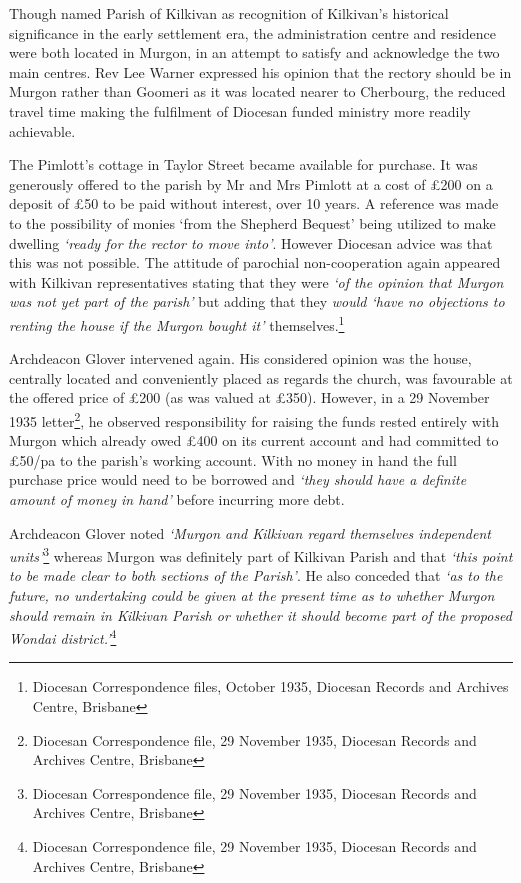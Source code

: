 Though named Parish of Kilkivan as recognition of Kilkivan's historical significance in the early settlement era, the administration centre and residence were both located in Murgon, in an attempt to satisfy and acknowledge the two main centres. Rev Lee Warner expressed his opinion that the rectory should be in Murgon rather than Goomeri as it was located nearer to Cherbourg, the reduced travel time making the fulfilment of Diocesan funded ministry more readily achievable.



The Pimlott's cottage in Taylor Street became available for purchase. It was generously offered to the parish by Mr and Mrs Pimlott at a cost of \pounds200 on a deposit of \pounds50 to be paid without interest, over 10 years. A reference was made to the possibility of monies `from the Shepherd Bequest' being utilized to make dwelling \emph{`ready for the rector to move into'}. However Diocesan advice was that this was not possible. The attitude of parochial non-cooperation again appeared with Kilkivan representatives stating that they were \emph{`of the opinion that Murgon was not yet part of the parish'} but adding that they \emph{would `have no objections to renting the house if the Murgon bought it'} themselves.\footnote{Diocesan Correspondence files, October 1935, Diocesan Records and Archives Centre, Brisbane}


Archdeacon Glover intervened again. His considered opinion was the house, centrally located and conveniently placed as regards the church, was favourable at the offered price of \pounds200 (as was valued at \pounds350). However, in a 29 November 1935 letter\footnote{Diocesan Correspondence file, 29 November 1935, Diocesan Records and Archives Centre, Brisbane}, he observed responsibility for raising the funds rested entirely with Murgon which already owed \pounds400 on its current account and had committed to \pounds50/pa to the parish's working account. With no money in hand the full purchase price would need to be borrowed and \emph{`they should have a definite amount of money in hand'} before incurring more debt.


Archdeacon Glover noted \emph{`Murgon and Kilkivan regard themselves independent units'}\footnote{Diocesan Correspondence file, 29 November 1935, Diocesan Records and Archives Centre, Brisbane} whereas Murgon was definitely part of Kilkivan Parish and that \emph{`this point to be made clear to both sections of the Parish'}. He also conceded that \emph{`as to the future, no undertaking could be given at the present time as to whether Murgon should remain in Kilkivan Parish or whether it should become part of the proposed Wondai district.'}\footnote{Diocesan Correspondence file, 29 November 1935, Diocesan Records and Archives Centre, Brisbane}








